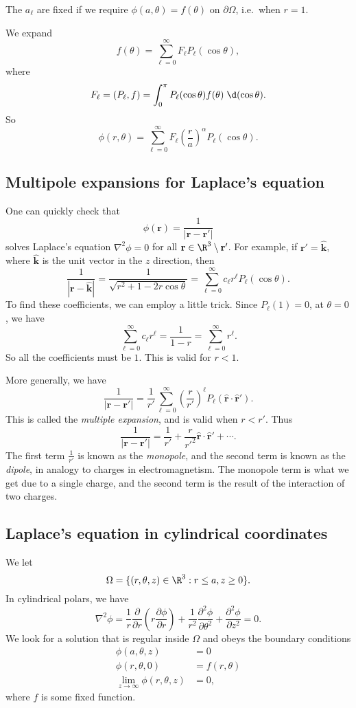 \documentclass[a4paper]{article}
\begin{document}
The $a_\ell$ are fixed if we require $\phi(a, \theta) = f(\theta)$ on $\partial \Omega$, i.e.\ when $r = 1$.

We expand
\[
  f(\theta) = \sum_{\ell = 0}^\infty F_\ell P_\ell(\cos \theta),
\]
where
\[
  F_\ell = (P_\ell, f) = \int_0^\pi P_{\ell}(\cos \theta) f(\theta) \;\d (\cos \theta).
\]
So
\[
  \phi(r, \theta) = \sum_{\ell = 0}^\infty F_\ell \left(\frac{r}{a}\right)^\alpha P_\ell(\cos \theta).
\]
\subsection{Multipole expansions for Laplace's equation}
One can quickly check that
\[
  \phi(\mathbf{r}) = \frac{1}{|\mathbf{r} - \mathbf{r}'|}
\]
solves Laplace's equation $\nabla^2 \phi = 0$ for all $\mathbf{r}\in \R^3 \setminus \mathbf{r}'$. For example, if $\mathbf{r}' = \hat{\mathbf{k}}$, where $\hat{\mathbf{k}}$ is the unit vector in the $z$ direction, then
\[
  \frac{1}{|\mathbf{r} - \hat{\mathbf{k}}|} = \frac{1}{\sqrt{r^2 + 1 - 2r \cos \theta}} = \sum_{\ell = 0}^\infty c_\ell r^\ell P_\ell(\cos \theta).
\]
To find these coefficients, we can employ a little trick. Since $P_\ell(1) = 0$, at $\theta = 0$, we have
\[
  \sum_{\ell = 0}^\infty c_\ell r^\ell = \frac{1}{1 - r} = \sum_{\ell = 0}^\infty r^\ell.
\]
So all the coefficients must be $1$. This is valid for $r < 1$.

More generally, we have
\[
  \frac{1}{|\mathbf{r} - \mathbf{r}'|} = \frac{1}{r'} \sum_{\ell = 0}^\infty \left(\frac{r}{r'}\right)^\ell P_\ell(\hat{\mathbf{r}}\cdot \hat{\mathbf{r}}').
\]
This is called the \emph{multiple expansion}, and is valid when $r < r'$. Thus
\[
  \frac{1}{|\mathbf{r} - \mathbf{r}'|} = \frac{1}{r'} + \frac{r}{r'^2}\hat{\mathbf{r}}\cdot \hat{\mathbf{r}}' + \cdots.
\]
The first term $\frac{1}{r'}$ is known as the \emph{monopole}, and the second term is known as the \emph{dipole}, in analogy to charges in electromagnetism. The monopole term is what we get due to a single charge, and the second term is the result of the interaction of two charges.

\subsection{Laplace's equation in cylindrical coordinates}
We let
\[
  \Omega = \{(r, \theta, z) \in \R^3: r \leq a, z \geq 0\}.
\]
In cylindrical polars, we have
\[
  \nabla^2 \phi = \frac{1}{r}\frac{\partial}{\partial r}\left(r \frac{\partial \phi}{\partial r}\right) + \frac{1}{r^2}\frac{\partial^2 \phi}{\partial \theta^2} + \frac{\partial^2 \phi}{\partial z^2} = 0.
\]
We look for a solution that is regular inside $\Omega$ and obeys the boundary conditions
\begin{align*}
  \phi(a, \theta, z) &= 0\\
  \phi(r, \theta, 0) &= f(r, \theta)\\
  \lim_{z\to \infty} \phi(r, \theta, z) &= 0,
\end{align*}
where $f$ is some fixed function.
\end{document}
